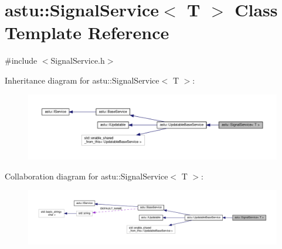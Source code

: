 \hypertarget{classastu_1_1SignalService}{}\section{astu\+:\+:Signal\+Service$<$ T $>$ Class Template Reference}
\label{classastu_1_1SignalService}


{\ttfamily \#include $<$Signal\+Service.\+h$>$}



Inheritance diagram for astu\+:\+:Signal\+Service$<$ T $>$\+:\nopagebreak
\begin{figure}[H]
\begin{center}
\leavevmode
\includegraphics[width=350pt]{classastu_1_1SignalService__inherit__graph}
\end{center}
\end{figure}


Collaboration diagram for astu\+:\+:Signal\+Service$<$ T $>$\+:\nopagebreak
\begin{figure}[H]
\begin{center}
\leavevmode
\includegraphics[width=350pt]{classastu_1_1SignalService__coll__graph}
\end{center}
\end{figure}
